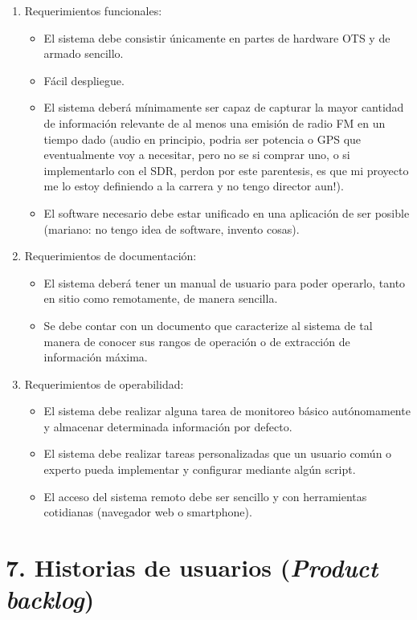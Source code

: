 \documentclass[
11pt, %
codirector, %
]{charter}
\begin{document}
\begin{enumerate}
	\item Requerimientos funcionales:
		\begin{itemize}
			\item El sistema debe consistir únicamente en partes de hardware OTS y de armado sencillo.
			\item Fácil despliegue.
			\item El sistema deberá mínimamente ser capaz de capturar la mayor cantidad de información relevante de al menos una emisión de radio FM en un tiempo dado (audio en principio, podria ser potencia o GPS que eventualmente voy a necesitar, pero no se si comprar uno, o si implementarlo con el SDR, perdon por este parentesis, es que mi proyecto me lo estoy definiendo a la carrera y no tengo director aun!).
			\item El software necesario debe estar unificado en una aplicación de ser posible (mariano: no tengo idea de software, invento cosas).
		\end{itemize}
	\item Requerimientos de documentación:
		\begin{itemize}
			\item El sistema deberá tener un manual de usuario para poder operarlo, tanto en sitio como remotamente, de manera sencilla.
			\item Se debe contar con un documento que caracterize al sistema de tal manera de conocer sus rangos de operación o de extracción de información máxima.
		\end{itemize}
	\item Requerimientos de operabilidad:
		\begin{itemize}
			\item El sistema debe realizar alguna tarea de monitoreo básico autónomamente y almacenar determinada información por defecto.
			\item El sistema debe realizar tareas personalizadas que un usuario común o experto pueda implementar y configurar mediante algún script.
			\item El acceso del sistema remoto debe ser sencillo y con herramientas cotidianas (navegador web o smartphone).
		\end{itemize}
\end{enumerate}

\section{7. Historias de usuarios (\textit{Product backlog})}
\label{sec:backlog}
\end{document}
